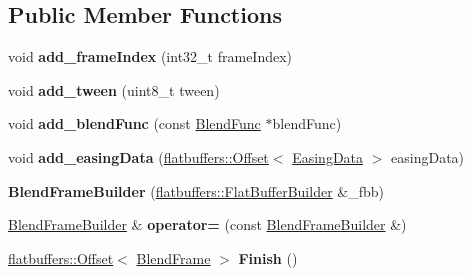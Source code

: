 \subsection*{Public Member Functions}
\begin{DoxyCompactItemize}
\item 
\mbox{\label{structflatbuffers_1_1BlendFrameBuilder_ad99aa0a9e8ebe7eda5aedb8ecd834c06}} 
void {\bfseries add\+\_\+frame\+Index} (int32\+\_\+t frame\+Index)
\item 
\mbox{\label{structflatbuffers_1_1BlendFrameBuilder_a52ec08e6142dfe7c3a15616e1d852bb9}} 
void {\bfseries add\+\_\+tween} (uint8\+\_\+t tween)
\item 
\mbox{\label{structflatbuffers_1_1BlendFrameBuilder_aad231a1dc8b42b1389d5814857c09334}} 
void {\bfseries add\+\_\+blend\+Func} (const \hyperlink{structBlendFunc}{Blend\+Func} $\ast$blend\+Func)
\item 
\mbox{\label{structflatbuffers_1_1BlendFrameBuilder_a2f7eda577a523393b9e5526161313443}} 
void {\bfseries add\+\_\+easing\+Data} (\hyperlink{structflatbuffers_1_1Offset}{flatbuffers\+::\+Offset}$<$ \hyperlink{structflatbuffers_1_1EasingData}{Easing\+Data} $>$ easing\+Data)
\item 
\mbox{\label{structflatbuffers_1_1BlendFrameBuilder_a52e79bc2033e2820ba2a8686a94286a9}} 
{\bfseries Blend\+Frame\+Builder} (\hyperlink{classflatbuffers_1_1FlatBufferBuilder}{flatbuffers\+::\+Flat\+Buffer\+Builder} \&\+\_\+fbb)
\item 
\mbox{\label{structflatbuffers_1_1BlendFrameBuilder_a94ef45e0a2a6f66ce44b6604ae934c53}} 
\hyperlink{structflatbuffers_1_1BlendFrameBuilder}{Blend\+Frame\+Builder} \& {\bfseries operator=} (const \hyperlink{structflatbuffers_1_1BlendFrameBuilder}{Blend\+Frame\+Builder} \&)
\item 
\mbox{\label{structflatbuffers_1_1BlendFrameBuilder_ac389596bf2a4969877e21ec99380f18b}} 
\hyperlink{structflatbuffers_1_1Offset}{flatbuffers\+::\+Offset}$<$ \hyperlink{structflatbuffers_1_1BlendFrame}{Blend\+Frame} $>$ {\bfseries Finish} ()

\end{DoxyCompactItemize}
